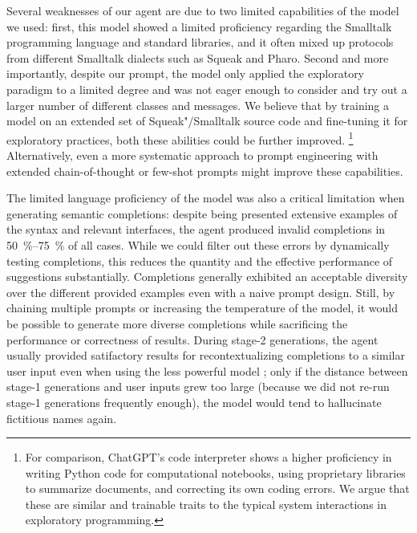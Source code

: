 Several weaknesses of our agent are due to two limited capabilities of the \gptfouro model we used:
first, this model showed a limited proficiency regarding the Smalltalk programming language and standard libraries, and it often mixed up protocols from different Smalltalk dialects such as Squeak and Pharo.
Second and more importantly, despite our prompt, the model only applied the exploratory paradigm to a limited degree and was not eager enough to consider and try out a larger number of different classes and messages.
We believe that by training a model on an extended set of Squeak"/Smalltalk source code and fine-tuning it for exploratory practices, both these abilities could be further improved.%
\footnote{
	For comparison, ChatGPT's code interpreter shows a higher proficiency in writing Python code for computational notebooks, using proprietary libraries to summarize documents, and correcting its own coding errors.
	We argue that these are similar and trainable traits to the typical system interactions in exploratory programming.
}
Alternatively, even a more systematic approach to prompt engineering with extended chain-of-thought or few-shot prompts might improve these capabilities.

The limited language proficiency of the model was also a critical limitation when generating semantic completions:
despite being presented extensive examples of the syntax and relevant interfaces, the agent produced invalid completions in \qty{50}{\percent}--\qty{75}{\percent} of all cases.
While we could filter out these errors by dynamically testing completions, this reduces the quantity and the effective performance of suggestions substantially.
Completions generally exhibited an acceptable diversity over the different provided examples even with a naive prompt design.
Still, by chaining multiple prompts or increasing the temperature of the model, it would be possible to generate more diverse completions while sacrificing the performance or correctness of results.
During stage-2 generations, the agent usually provided satifactory results for recontextualizing completions to a similar user input even when using the less powerful model \gptfouromini; only if the distance between stage-1 generations and user inputs grew too large (because we did not re-run stage-1 generations frequently enough), the model would tend to hallucinate fictitious names again.
